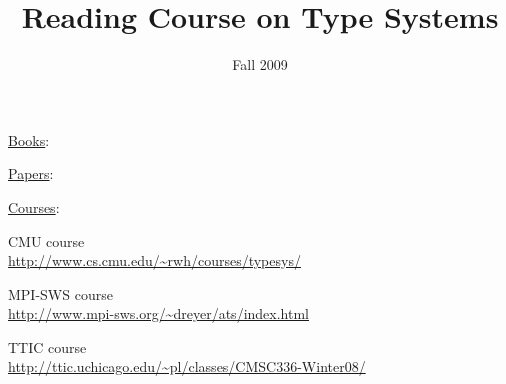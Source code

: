\documentclass[12pt]{article}	%
\begin{document}
\title{Reading Course on Type Systems}
\date{Fall 2009}

\maketitle
												
\begin{flushleft}

\underline{Books}: \\

\vspace{2mm}

\cite{Girard89Proofs}
\cite{Barendregt93Types}
\cite{Harper96TypeSystems}
\cite{Sorensen98CurryHoward}
\cite{Pierce02TAPL}
\cite{Pierce04ATTAPL}

\vspace{5mm}

\underline{Papers}: \\

\vspace{2mm}

\cite{Reynolds74TypeStructure}
\cite{Damas82Principal}
\cite{Reynolds83Parametric}
\cite{Wadler89AdHoc}
\cite{Wadler89TheoremsFree}
\cite{Abadi89DynamicTyping}
\cite{Abadi91DynamicTyping}
\cite{Wright92Syntactic}
\cite{Jones07ArbitraryRank}

\vspace{5mm}

\underline{Courses}: \\

\vspace{2mm}

CMU course \\
\url{http://www.cs.cmu.edu/~rwh/courses/typesys/} \\

\vspace{2mm}

MPI-SWS course \\
\url{http://www.mpi-sws.org/~dreyer/ats/index.html} \\

\vspace{2mm}

TTIC course \\
\url{http://ttic.uchicago.edu/~pl/classes/CMSC336-Winter08/} \\

\end{flushleft}



\end{document}
